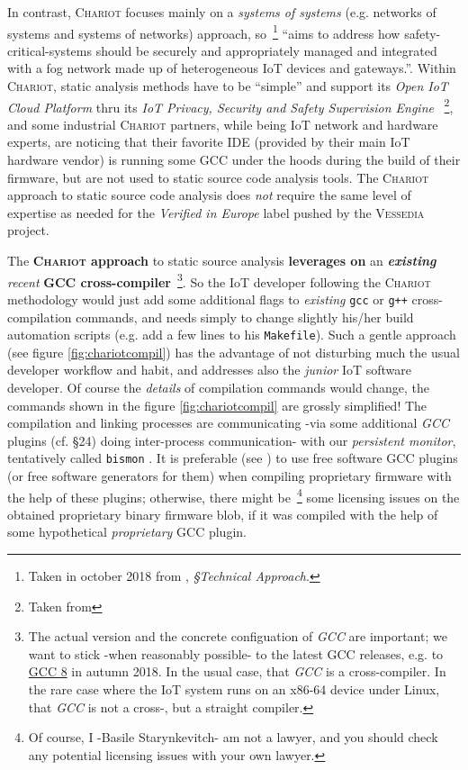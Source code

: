 In contrast, \textsc{Chariot} focuses mainly on a \emph{systems of
  systems} (e.g. networks of systems and systems of networks)
approach, so~\footnote{Taken in october 2018 from , \emph{§Technical Approach}.}
``aims to address how safety-critical-systems should
be securely and appropriately managed and integrated with a fog
network made up of heterogeneous IoT devices and gateways.''. Within
\textsc{Chariot}, static analysis methods have to be ``simple'' and
support its \emph{Open IoT Cloud Platform} thru its \emph{IoT Privacy,
  Security and Safety Supervision Engine} ~\footnote{Taken
  from }, and some
industrial \textsc{Chariot} partners, while being IoT network and
hardware experts, are noticing that their favorite IDE (provided by
their main IoT hardware vendor) is running some GCC under the hoods
during the build of their firmware, but are not used to static source
code analysis tools. The \textsc{Chariot} approach to static source
code analysis does \emph{not} require the same level of expertise as needed for
the \emph{Verified in Europe} label pushed by the \textsc{Vessedia}
project.

The \textbf{\textsc{Chariot} approach} to static source analysis
\textbf{leverages on} an \textbf{\emph{existing}} \emph{recent}
\textbf{GCC cross-compiler}~\footnote{The actual version and
  the concrete configuation of \emph{GCC} are important; we want to stick -when
  reasonably possible- to the latest GCC releases, e.g. to
  \href{https://gcc.gnu.org/gcc-8/}{GCC 8} in autumn 2018. In the
  usual case, that \emph{GCC} is a cross-compiler. In the rare case
  where the IoT system runs on an x86-64 device under Linux, that
  \emph{GCC} is not a cross-, but a straight compiler.}. So the IoT
developer following the \textsc{Chariot} methodology would just add
some additional flags to \emph{existing} \texttt{gcc} or \texttt{g++}
cross-compilation commands, and needs simply to change slightly
his/her build automation scripts (e.g. add a few lines to his
\texttt{Makefile}). Such a gentle approach (see figure
\ref{fig:chariotcompil}) has the advantage of not disturbing much the usual
developer workflow and habit, and addresses also the \emph{junior} IoT
software developer. Of course the \emph {details} of compilation
commands would change, the commands shown in the figure \ref{fig:chariotcompil} are grossly
simplified! The compilation and linking processes are
communicating -via some additional \emph{GCC} plugins
(cf. \cite{gcc-internals} §24) doing inter-process communication- with
our  
\emph{persistent monitor}, tentatively called \texttt{bismon}
. It is preferable (see
\cite{gcc-runtime-library-exception}) to use free software GCC plugins
(or free software generators for them) when compiling proprietary
firmware with the help of these plugins; otherwise, there might
be~\footnote{Of course, I -Basile Starynkevitch- am not a lawyer, and
  you should check any potential licensing issues with your own
  lawyer.} some licensing issues on the obtained proprietary binary
firmware blob, if it was compiled with the help of some hypothetical
\emph{proprietary} GCC plugin.

